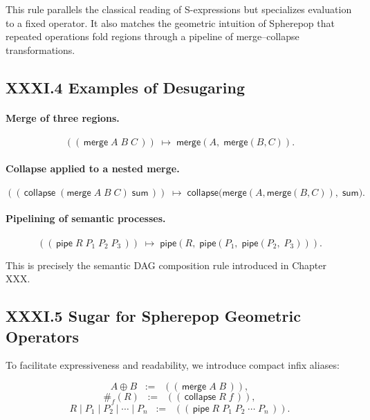 \documentclass[12pt,letterpaper]{article}
\begin{document}
\begin{remark}
This rule parallels the classical reading of S-expressions but specializes evaluation to a fixed operator. It also matches the geometric intuition of Spherepop that repeated operations fold regions through a pipeline of merge--collapse transformations.
\end{remark}

\subsection{XXXI.4 Examples of Desugaring}

\paragraph{Merge of three regions.}
\[
((\,\mathsf{merge}\; A\; B\; C\,))
\;\mapsto\;
\mathsf{merge}(A,\; \mathsf{merge}(B, C)).
\]

\paragraph{Collapse applied to a nested merge.}
\[
((\,\mathsf{collapse}\; (\mathsf{merge}\; A\; B\; C)\; \mathsf{sum}\,))
\;\mapsto\;
\mathsf{collapse}\big(\mathsf{merge}(A,\mathsf{merge}(B,C)),\; \mathsf{sum}\big).
\]

\paragraph{Pipelining of semantic processes.}
\[
((\,\mathsf{pipe}\; R\; P_1\; P_2\; P_3\,))
\;\mapsto\;
\mathsf{pipe}(R,\; \mathsf{pipe}(P_1,\; \mathsf{pipe}(P_2,\; P_3))).
\]

This is precisely the semantic DAG composition rule introduced in Chapter XXX.

\subsection{XXXI.5 Sugar for Spherepop Geometric Operators}

To facilitate expressiveness and readability, we introduce compact infix aliases:

\[
A \oplus B 
\;\;:=\;\;
((\,\mathsf{merge}\; A\; B\,)),
\]
\[
\#_f(R)
\;\;:=\;\;
((\,\mathsf{collapse}\; R\; f\,)),
\]
\[
R \mid P_1 \mid P_2 \mid \cdots \mid P_n
\;\;:=\;\;
((\,\mathsf{pipe}\; R\; P_1\; P_2\; \cdots\; P_n\,)).
\]
\end{document}
